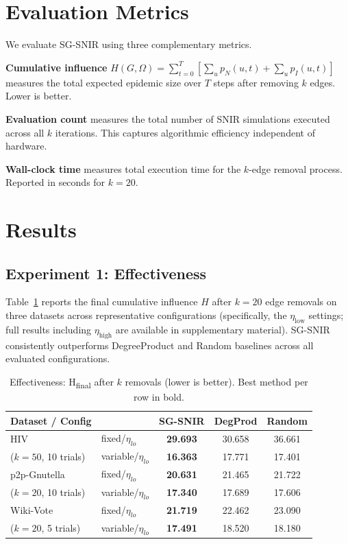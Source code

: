 \documentclass[conference]{IEEEtran}
\begin{document}
\section{Evaluation Metrics}
\label{sec:metrics}

We evaluate SG-SNIR using three complementary metrics.

\textbf{Cumulative influence} $H(G,\Omega) = \sum_{t=0}^{T}[\sum_u p_N(u,t) + \sum_u p_I(u,t)]$ measures the total expected epidemic size over $T$ steps after removing $k$ edges. Lower is better.

\textbf{Evaluation count} measures the total number of SNIR simulations executed across all $k$ iterations. This captures algorithmic efficiency independent of hardware.

\textbf{Wall-clock time} measures total execution time for the $k$-edge removal process. Reported in seconds for $k=20$.

\section{Results}
\label{sec:results}

\subsection{Experiment 1: Effectiveness}

Table~\ref{tab:effectiveness} reports the final cumulative influence $H$ after $k=20$ edge removals on three datasets across representative configurations (specifically, the $\eta_{\mathrm{low}}$ settings; full results including $\eta_{\mathrm{high}}$ are available in supplementary material). SG-SNIR consistently outperforms DegreeProduct and Random baselines across all evaluated configurations.

\begin{table}[htbp]
\caption{Effectiveness: H\textsubscript{final} after $k$ removals (lower is better). Best method per row in bold.}
\label{tab:effectiveness}
\centering
\small
\begin{tabular}{llccc}
\hline
\textbf{Dataset / Config} & & \textbf{SG-SNIR} & \textbf{DegProd} & \textbf{Random} \\
\hline
HIV & fixed/$\eta_{lo}$ & \textbf{29.693} & 30.658 & 36.661 \\
($k=50$, 10 trials) & variable/$\eta_{lo}$ & \textbf{16.363} & 17.771 & 17.401 \\
p2p-Gnutella & fixed/$\eta_{lo}$ & \textbf{20.631} & 21.465 & 21.722 \\
($k=20$, 10 trials) & variable/$\eta_{lo}$ & \textbf{17.340} & 17.689 & 17.606 \\
Wiki-Vote & fixed/$\eta_{lo}$ & \textbf{21.719} & 22.462 & 23.090 \\
($k=20$, 5 trials) & variable/$\eta_{lo}$ & \textbf{17.491} & 18.520 & 18.180 \\
\hline
\end{tabular}
\end{table}
\end{document}
